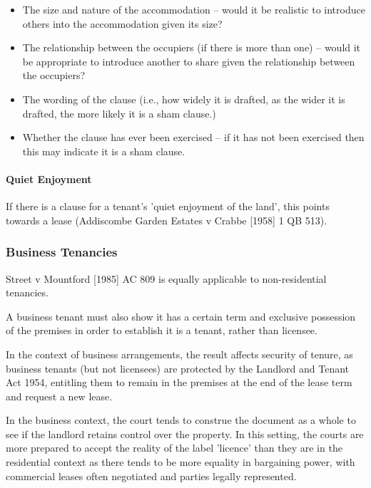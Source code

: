 \documentclass[
]{article}
\providecommand{\tightlist}{%
  \setlength{\itemsep}{0pt}\setlength{\parskip}{0pt}}
\begin{document}
\begin{itemize}
\tightlist
\item
  The size and nature of the accommodation -- would it be realistic to
  introduce others into the accommodation given its size?
\item
  The relationship between the occupiers (if there is more than one) --
  would it be appropriate to introduce another to share given the
  relationship between the occupiers?
\item
  The wording of the clause (i.e., how widely it is drafted, as the
  wider it is drafted, the more likely it is a sham clause.)
\item
  Whether the clause has ever been exercised -- if it has not been
  exercised then this may indicate it is a sham clause.
\end{itemize}

\hypertarget{quiet-enjoyment}{%
\paragraph{Quiet Enjoyment}\label{quiet-enjoyment}}

If there is a clause for a tenant's 'quiet enjoyment of the land', this
points towards a lease (Addiscombe Garden Estates v Crabbe {[}1958{]} 1
QB 513).

\hypertarget{business-tenancies}{%
\subsubsection{Business Tenancies}\label{business-tenancies}}

Street v Mountford {[}1985{]} AC 809 is equally applicable to
non-residential tenancies.

A business tenant must also show it has a certain term and exclusive
possession of the premises in order to establish it is a tenant, rather
than licensee.

In the context of business arrangements, the result affects security of
tenure, as business tenants (but not licensees) are protected by the
Landlord and Tenant Act 1954, entitling them to remain in the premises
at the end of the lease term and request a new lease.

In the business context, the court tends to construe the document as a
whole to see if the landlord retains control over the property. In this
setting, the courts are more prepared to accept the reality of the label
'licence' than they are in the residential context as there tends to be
more equality in bargaining power, with commercial leases often
negotiated and parties legally represented.
\end{document}
